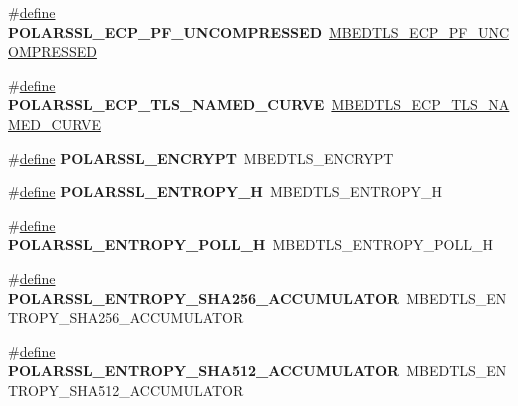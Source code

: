 \begin{DoxyCompactItemize}
\item 
\mbox{\label{compat-1_83_8h_ac9035f34ba62d16e0e37bdaca67e37e2}} 
\#\hyperlink{structdefine}{define} {\bfseries P\+O\+L\+A\+R\+S\+S\+L\+\_\+\+E\+C\+P\+\_\+\+P\+F\+\_\+\+U\+N\+C\+O\+M\+P\+R\+E\+S\+S\+ED}~\hyperlink{ecp_8h_a076e0db0a53f09d424b8650390632bb3}{M\+B\+E\+D\+T\+L\+S\+\_\+\+E\+C\+P\+\_\+\+P\+F\+\_\+\+U\+N\+C\+O\+M\+P\+R\+E\+S\+S\+ED}
\item 
\mbox{\label{compat-1_83_8h_a8dd54f6888aed50a45a3ba56af003553}} 
\#\hyperlink{structdefine}{define} {\bfseries P\+O\+L\+A\+R\+S\+S\+L\+\_\+\+E\+C\+P\+\_\+\+T\+L\+S\+\_\+\+N\+A\+M\+E\+D\+\_\+\+C\+U\+R\+VE}~\hyperlink{ecp_8h_a5bfe061b705a8695d730dfca7d265407}{M\+B\+E\+D\+T\+L\+S\+\_\+\+E\+C\+P\+\_\+\+T\+L\+S\+\_\+\+N\+A\+M\+E\+D\+\_\+\+C\+U\+R\+VE}
\item 
\mbox{\label{compat-1_83_8h_a4deb9f02fa4818eb421b5204e889ad74}} 
\#\hyperlink{structdefine}{define} {\bfseries P\+O\+L\+A\+R\+S\+S\+L\+\_\+\+E\+N\+C\+R\+Y\+PT}~M\+B\+E\+D\+T\+L\+S\+\_\+\+E\+N\+C\+R\+Y\+PT
\item 
\mbox{\label{compat-1_83_8h_a0a2ae1f118c7cc66d2974d13fc1836a5}} 
\#\hyperlink{structdefine}{define} {\bfseries P\+O\+L\+A\+R\+S\+S\+L\+\_\+\+E\+N\+T\+R\+O\+P\+Y\+\_\+H}~M\+B\+E\+D\+T\+L\+S\+\_\+\+E\+N\+T\+R\+O\+P\+Y\+\_\+H
\item 
\mbox{\label{compat-1_83_8h_a5a6b61d667fca6fc9982bf1a0ae01a47}} 
\#\hyperlink{structdefine}{define} {\bfseries P\+O\+L\+A\+R\+S\+S\+L\+\_\+\+E\+N\+T\+R\+O\+P\+Y\+\_\+\+P\+O\+L\+L\+\_\+H}~M\+B\+E\+D\+T\+L\+S\+\_\+\+E\+N\+T\+R\+O\+P\+Y\+\_\+\+P\+O\+L\+L\+\_\+H
\item 
\mbox{\label{compat-1_83_8h_aae901da2a3341767b2dc61f7e21876a1}} 
\#\hyperlink{structdefine}{define} {\bfseries P\+O\+L\+A\+R\+S\+S\+L\+\_\+\+E\+N\+T\+R\+O\+P\+Y\+\_\+\+S\+H\+A256\+\_\+\+A\+C\+C\+U\+M\+U\+L\+A\+T\+OR}~M\+B\+E\+D\+T\+L\+S\+\_\+\+E\+N\+T\+R\+O\+P\+Y\+\_\+\+S\+H\+A256\+\_\+\+A\+C\+C\+U\+M\+U\+L\+A\+T\+OR
\item 
\mbox{\label{compat-1_83_8h_a9d15b029b1caee03c5c2b77b81c1147f}} 
\#\hyperlink{structdefine}{define} {\bfseries P\+O\+L\+A\+R\+S\+S\+L\+\_\+\+E\+N\+T\+R\+O\+P\+Y\+\_\+\+S\+H\+A512\+\_\+\+A\+C\+C\+U\+M\+U\+L\+A\+T\+OR}~M\+B\+E\+D\+T\+L\+S\+\_\+\+E\+N\+T\+R\+O\+P\+Y\+\_\+\+S\+H\+A512\+\_\+\+A\+C\+C\+U\+M\+U\+L\+A\+T\+OR

\end{DoxyCompactItemize}
